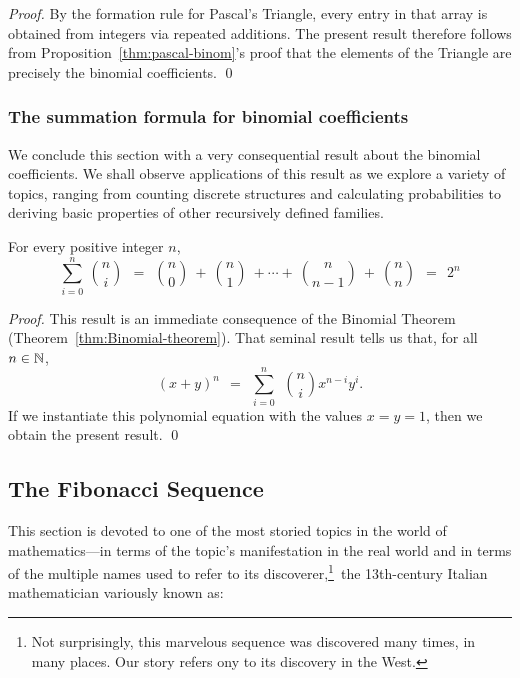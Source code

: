 \begin{proof}
By the formation rule for Pascal's Triangle, every entry in that array
is obtained from integers via repeated additions.  The present result
therefore follows from Proposition~\ref{thm:pascal-binom}'s proof that
the elements of the Triangle are precisely the binomial coefficients.  \qed
\end{proof}


\subsubsection{The summation formula for binomial coefficients}
\label{sec:summaion-BinCoeff}

We conclude this section with a very consequential result about the
binomial coefficients.  We shall observe applications of this result
as we explore a variety of topics, ranging from counting discrete
structures and calculating probabilities to deriving basic properties
of other recursively defined families.


\begin{prop}
\label{thm:sumsof-binomcoeff}
For every positive integer $n$,
\[
\sum_{i=0}^n \ {n \choose i} \ \ = \ \
{n \choose 0} \ + \ {n \choose 1} \ + \cdots + \ {n \choose {n-1}} \ +
\ {n \choose n} \ \ = \ \ 2^n
\]
\end{prop}

\begin{proof}
This result is an immediate consequence of the Binomial Theorem
(Theorem~\ref{thm:Binomial-theorem}).  That seminal result tells us
that, for all $n \in \mathbb{N}$,
\[
(x+y)^n \ \ = \ \ \sum_{i=0}^n \ \ {n \choose i} x^{n-i} y^i.
\]
If we instantiate this polynomial equation with the values $x = y =
1$, then we obtain the present result.
\qed
\end{proof}


\subsection{The Fibonacci Sequence}
\label{sec:Fibonacci}

This section is devoted to one of the most storied topics in the world
of mathematics---in terms of the topic's manifestation in the real
world and in terms of the multiple names used to refer to its
discoverer,\footnote{Not surprisingly, this marvelous sequence was
  discovered many times, in many places.  Our story refers ony to its
  discovery in the West.}~the 13th-century Italian mathematician
variously known as: \index{Fibonacci, Leonardo}

